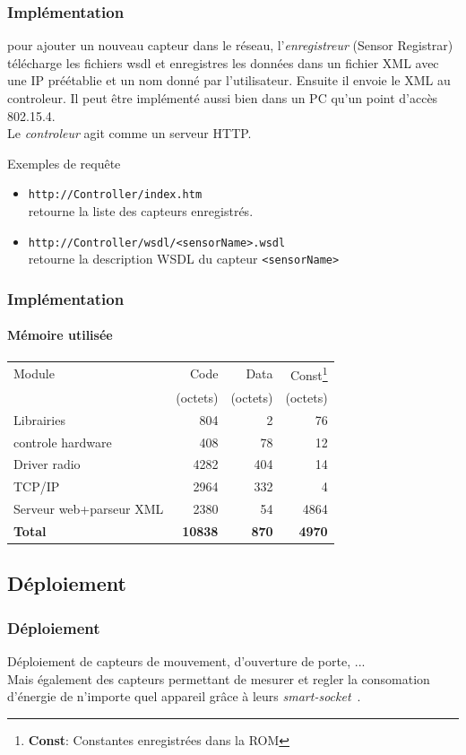 \begin{frame}
 \frametitle{Implémentation}
 pour ajouter un nouveau capteur dans le réseau, l'\textit{enregistreur} (Sensor Registrar) télécharge les fichiers wsdl et enregistres les données dans un fichier XML avec une IP préétablie et un nom donné par l'utilisateur.
 Ensuite il envoie le XML au controleur.
 Il peut être implémenté aussi bien dans un PC qu'un point d'accès 802.15.4.\\
 \vspace{4mm}
 Le \textit{controleur} agit comme un serveur HTTP.
 \begin{exampleblock}{Exemples de requête}
 \begin{itemize}
  \item \texttt{http://Controller/index.htm}\\retourne la liste des capteurs enregistrés.
  \item \texttt{http://Controller/wsdl/<sensorName>.wsdl}\\retourne la description WSDL du capteur \texttt{<sensorName>}
 \end{itemize} 
 \end{exampleblock}
\end{frame}


\newcommand{\unite}{(octets)}
\begin{frame}%
 \frametitle{Implémentation}
 \framesubtitle{Mémoire utilisée}
 \begin{center}
 \begin{tabular}{|l|r|r|r|}
  \hline
  Module & Code & Data & Const\footnote{\textbf{Const}: Constantes enregistrées dans la ROM}\\
  ~ & \unite & \unite & \unite \\
  \hline
  Librairies & 804 & 2 & 76\\
  controle hardware & 408 & 78 & 12\\
  Driver radio & 4282 & 404 & 14\\
  TCP/IP & 2964 & 332 & 4\\
  Serveur web+parseur XML & 2380 & 54 & 4864\\
  \hline
  \textbf{Total} & \textbf{10838} & \textbf{870} & \textbf{4970}\\
  \hline
 \end{tabular}
 \end{center}
\end{frame}

\subsection{Déploiement}
\newcommand{\smartsocket}{\textit{smart-socket}~}
\begin{frame}
 \frametitle{Déploiement}
 Déploiement de capteurs de mouvement, d'ouverture de porte, ...\\
 \vspace{5mm}
 Mais également des capteurs permettant de mesurer et regler la consomation d'énergie de n'importe quel appareil grâce à leurs \alert{\smartsocket}.
\end{frame}

